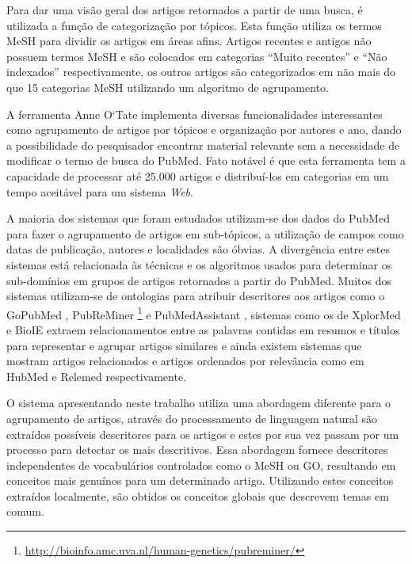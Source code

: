 Para dar uma visão geral dos artigos retornados a partir de uma busca, é utilizada a função de categorização por tópicos. Esta função utiliza os termos MeSH para dividir os artigos em áreas afins. Artigos recentes e antigos não possuem termos MeSH e são colocados em categorias ``Muito recentes'' e ``Não indexados'' respectivamente, os outros artigos são categorizados em não mais do que 15 categorias MeSH utilizando um algoritmo de agrupamento.

A ferramenta Anne O`Tate implementa diversas funcionalidades interessantes como agrupamento de artigos por tópicos e organização por autores e ano, dando a possibilidade do pesquisador encontrar material relevante sem a necessidade de modificar o termo de busca do PubMed. Fato notável é que esta ferramenta tem a capacidade de processar até 25.000 artigos e distribuí-los em categorias em um tempo aceitável para um sistema \emph{Web}.

A maioria dos sistemas que foram estudados utilizam-se dos dados do PubMed para fazer o agrupamento de artigos em sub-tópicos, a utilização de campos como datas de publicação, autores e localidades são óbvias. A divergência entre estes sistemas está relacionada às técnicas e os algoritmos usados para determinar os sub-domínios em grupos de artigos retornados a partir do PubMed. Muitos dos sistemas utilizam-se de ontologias para atribuir descritores aos artigos como o GoPubMed \cite{Doms2005}, PubReMiner \footnote{\href{http://bioinfo.amc.uva.nl/human-genetics/pubreminer/}{http://bioinfo.amc.uva.nl/human-genetics/pubreminer/}} e PubMedAssistant \cite{Ding2006}, sistemas como os de  XplorMed \cite{Perez-Iratxeta2001} e BioIE \cite{Divoli2005} extraem relacionamentos entre as palavras contidas em resumos e títulos para representar e agrupar artigos similares e ainda existem sistemas que mostram artigos relacionados e artigos ordenados por relevância como em HubMed \cite{Eaton2006} e Relemed \cite{Siadaty2007} respectivamente.

O sistema apresentando neste trabalho utiliza uma abordagem diferente para o agrupamento de artigos, através do processamento de linguagem natural são extraídos possíveis descritores para os artigos e estes por sua vez passam por um processo para detectar os mais descritivos. Essa abordagem fornece descritores independentes de vocabulários controlados como o MeSH ou GO, resultando em conceitos mais genuínos para um determinado artigo. Utilizando estes conceitos extraídos localmente, são obtidos os conceitos globais que descrevem temas em comum.


